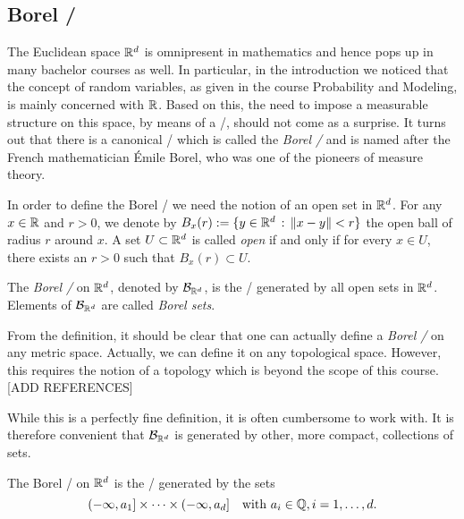 \subsection{Borel \sigalg/}

The Euclidean space $\mathbb R^d$ is omnipresent in mathematics and hence pops up in many bachelor courses as well. In particular, in the introduction we noticed that the concept of random variables, as given in the course Probability and Modeling, is mainly concerned with $\mathbb R$. Based on this, the need to impose a measurable structure on this space, by means of a \sigalg/, should not come as a surprise. It turns out that there is a canonical \sigalg/ which is called the \emph{Borel \sigalg/} and is named after the French mathematician \'{E}mile Borel, who was one of the pioneers of measure theory.

In order to define the Borel \sigalg/ we need the notion of an open set in $\mathbb R^d$. For any $x \in \mathbb R$ and $r >0$, we denote by $B_x(r) := \{y \in \mathbb R^d \, : \, \|x-y\|<r\}$ the open ball of radius $r$ around $x$. A set $U \subset \mathbb R^d$ is called \emph{open} if and only if for every $x \in U$, there exists an $r > 0$ such that $B_x(r) \subset U$.

\begin{definition}
The \emph{Borel \sigalg/} on $\mathbb R^d$, denoted by $\mathcal B_{\mathbb R^d}$, is the \sigalg/ generated by all open sets in $\mathbb R^d$. Elements of $\mathcal B_{\mathbb R^d}$ are called \emph{Borel sets}.
\end{definition}

\begin{remark}
From the definition, it should be clear that one can actually define a \emph{Borel \sigalg/} on any metric space. Actually, we can define it on any topological space. However, this requires the notion of a topology which is beyond the scope of this course. [ADD REFERENCES]
\end{remark}

While this is a perfectly fine definition, it is often cumbersome to work with. It is therefore convenient that $\mathcal B_{\mathbb R^d}$ is generated by other, more compact, collections of sets.

\begin{proposition}
The Borel \sigalg/ on $\mathbb R^d$ is the \sigalg/ generated by the sets
\[
	(-\infty,a_1] \times \dots \times (-\infty, a_d] \quad \text{with } a_i \in \mathbb Q, i = 1, \dots, d.
\]
\end{proposition}

